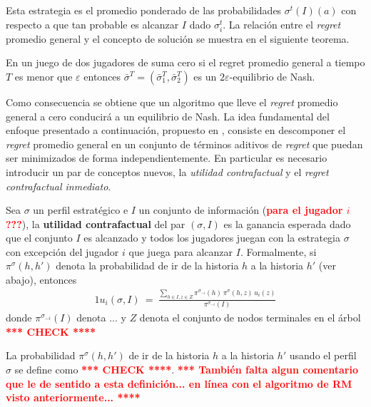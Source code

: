 Esta estrategia es el promedio ponderado de las probabilidades $\sigma^t(I)(a)$ con respecto a que tan probable es alcanzar $I$ dado $\sigma_i^t$. La relación entre el \textit{regret} promedio general y el concepto de solución se muestra en el siguiente teorema.

\begin{theorem}
\label{theo:regret-nash}
En un juego de dos jugadores de suma cero si el regret promedio general a tiempo $T$ es menor que $\varepsilon$ entonces $\bar{\sigma}^{T}=(\bar\sigma^T_1,\bar\sigma^T_2)$ es un $2\varepsilon$-equilibrio de Nash.
\end{theorem}

Como consecuencia se obtiene que un algoritmo que lleve el \mbox{\textit{regret}} promedio general a cero conducirá a un equilibrio de Nash. La idea fundamental del enfoque presentado a continuación, propuesto en \cite{bib:cfr}, consiste en descomponer el \textit{regret} promedio general en un conjunto de términos aditivos de \textit{regret} que puedan ser minimizados de forma independientemente. En particular es necesario introducir un par de conceptos nuevos, la \textit{utilidad contrafactual} y el \textit{regret contrafactual inmediato}.

\begin{definition}
\label{def:utilidad-contrafactual}
Sea $\sigma$ un perfil estratégico e $I$ un conjunto de información (\textcolor{red}{\bf para el jugador $i$???}), la \textbf{utilidad contrafactual} del par $(\sigma,I)$ es la ganancia esperada dado que el conjunto $I$ es alcanzado y todos los jugadores juegan con la estrategia $\sigma$ con excepción del jugador $i$ que juega para alcanzar $I$. Formalmente, si $\pi^{\sigma}(h, h')$ denota la probabilidad  de ir de la historia $h$ a la historia $h'$ (ver abajo), entonces
\begin{alignat}{1}
u_i(\sigma, I)\ =\ \frac{\sum_{h \in I, z \in Z} \pi^{\sigma_{-i}}(h)\, \pi^{\sigma}(h, z)\, u_i(z)}{\pi^{\sigma_{-i}}(I)}
\end{alignat}
donde $\pi^{\sigma_{-i}}(I)$ denota ... y $Z$ denota el conjunto de nodos terminales en el árbol \textcolor{red}{\bf **** CHECK ****}
\end{definition}

La probabilidad $\pi^{\sigma}(h, h')$ de ir de la historia $h$ a la historia $h'$ usando el perfil $\sigma$ se define como \textcolor{red}{\bf **** CHECK ****}. \textcolor{red}{\bf **** También falta algun comentario que le de sentido a esta definición... en línea con el algoritmo de RM visto anteriormente... ****}

